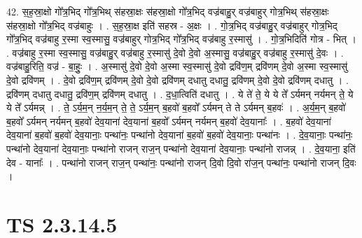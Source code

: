 \documentclass[17pt]{extarticle}
\begin{document}
42. स॒ह॒स्रा॒क्षो गो᳚त्र॒भिद् गो᳚त्र॒भिथ् स॑हस्रा॒क्षः स॑हस्रा॒क्षो गो᳚त्र॒भिद् वज्र॑बाहु॒र् वज्र॑बाहुर् गोत्र॒भिथ् स॑हस्रा॒क्षः स॑हस्रा॒क्षो गो᳚त्र॒भिद् वज्र॑बाहुः । . स॒ह॒स्रा॒क्ष इति॑ सहस्र - अ॒क्षः । . गो॒त्र॒भिद् वज्र॑बाहु॒र् वज्र॑बाहुर् गोत्र॒भिद् गो᳚त्र॒भिद् वज्र॑बाहु र॒स्मा स्व॒स्मासु॒ वज्र॑बाहुर् गोत्र॒भिद् गो᳚त्र॒भिद् वज्र॑बाहु र॒स्मासु॑ । . गो॒त्र॒भिदिति॑ गोत्र - भित् । . वज्र॑बाहु र॒स्मा स्व॒स्मासु॒ वज्र॑बाहु॒र् वज्र॑बाहु र॒स्मासु॑ दे॒वो दे॒वो अ॒स्मासु॒ वज्र॑बाहु॒र् वज्र॑बाहु र॒स्मासु॑ दे॒वः । . वज्र॑बाहु॒रिति॒ वज्र॑ - बा॒हुः॒ । . अ॒स्मासु॑ दे॒वो दे॒वो अ॒स्मा स्व॒स्मासु॑ दे॒वो द्रवि॑ण॒म् द्रवि॑णम् दे॒वो अ॒स्मा स्व॒स्मासु॑ दे॒वो द्रवि॑णम् । . दे॒वो द्रवि॑ण॒म् द्रवि॑णम् दे॒वो दे॒वो द्रवि॑णम् दधातु दधातु॒ द्रवि॑णम् दे॒वो दे॒वो द्रवि॑णम् दधातु । . द्रवि॑णम् दधातु दधातु॒ द्रवि॑ण॒म् द्रवि॑णम् दधातु । . द॒धा॒त्विति॑ दधातु । . ये ते॑ ते॒ ये ये ते᳚ ऽर्यमन् नर्यमन् ते॒ ये ये ते᳚ ऽर्यमन्न् । . ते॒ ऽर्य॒म॒न् न॒र्य॒म॒न् ते॒ ते॒ ऽर्य॒म॒न् ब॒हवो॑ ब॒हवो᳚ ऽर्यमन् ते ते ऽर्यमन् ब॒हवः॑ । . अ॒र्य॒म॒न् ब॒हवो॑ ब॒हवो᳚ ऽर्यमन् नर्यमन् ब॒हवो॑ देव॒याना॑ देव॒याना॑ ब॒हवो᳚ ऽर्यमन् नर्यमन् ब॒हवो॑ देव॒यानाः᳚ । . ब॒हवो॑ देव॒याना॑ देव॒याना॑ ब॒हवो॑ ब॒हवो॑ देव॒यानाः॒ पन्था॑नः॒ पन्था॑नो देव॒याना॑ ब॒हवो॑ ब॒हवो॑ देव॒यानाः॒ पन्था॑नः । . दे॒व॒यानाः॒ पन्था॑नः॒ पन्था॑नो देव॒याना॑ देव॒यानाः॒ पन्था॑नो राजन् राज॒न् पन्था॑नो देव॒याना॑ देव॒यानाः॒ पन्था॑नो राजन्न् । . दे॒व॒याना॒ इति॑ देव - यानाः᳚ । . पन्था॑नो राजन् राज॒न् पन्था॑नः॒ पन्था॑नो राजन् दि॒वो दि॒वो रा॑ज॒न् पन्था॑नः॒ पन्था॑नो राजन् दि॒वः । \newline
\pagebreak
{}

\section{ TS 2.3.14.5 }
\end{document}
